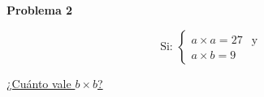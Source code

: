 \begin{center}
\Large \textbf{Problema 2}
\end{center}

\[
\text{Si: }
\begin{cases} 
    a \times a = 27 & \text{y} \\
    a \times b = 9
\end{cases}
\]

\underline{¿Cuánto vale $b \times b$?}

